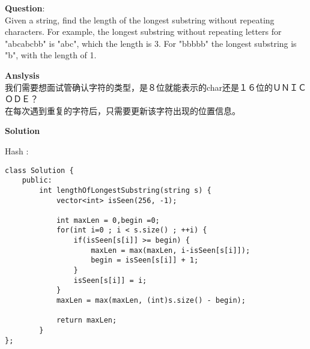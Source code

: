     
\begin{description}
    \item{\textbf{Question}}:\\%
		Given a string, find the length of the longest substring without repeating characters. For example, the longest substring without repeating letters for "abcabcbb" is "abc", which the length is 3. For "bbbbb" the longest substring is "b", with the length of 1.\\

    \item{\textbf{Anslysis}}\\
		我们需要想面试管确认字符的类型，是８位就能表示的char还是１６位的ＵＮＩＣＯＤＥ？\\
		在每次遇到重复的字符后，只需要更新该字符出现的位置信息。\\


    \item{\textbf{Solution}}\\
	\item{Hash} : \\
		\begin{lstlisting}
class Solution {
	public:
		int lengthOfLongestSubstring(string s) {
			vector<int> isSeen(256, -1);

			int maxLen = 0,begin =0;
			for(int i=0 ; i < s.size() ; ++i) {
				if(isSeen[s[i]] >= begin) {
					maxLen = max(maxLen, i-isSeen[s[i]]);
					begin = isSeen[s[i]] + 1;
				}
				isSeen[s[i]] = i;
			}
			maxLen = max(maxLen, (int)s.size() - begin);

			return maxLen;
		}
};
		\end{lstlisting}

\end{description}

